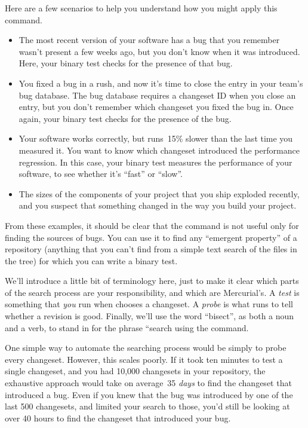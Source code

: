 Here are a few scenarios to help you understand how you might apply
this command.
\begin{itemize}
\item The most recent version of your software has a bug that you
  remember wasn't present a few weeks ago, but you don't know when it
  was introduced.  Here, your binary test checks for the presence of
  that bug.
\item You fixed a bug in a rush, and now it's time to close the entry
  in your team's bug database.  The bug database requires a changeset
  ID when you close an entry, but you don't remember which changeset
  you fixed the bug in.  Once again, your binary test checks for the
  presence of the bug.
\item Your software works correctly, but runs~15\% slower than the
  last time you measured it.  You want to know which changeset
  introduced the performance regression.  In this case, your binary
  test measures the performance of your software, to see whether it's
  ``fast'' or ``slow''.
\item The sizes of the components of your project that you ship
  exploded recently, and you suspect that something changed in the way
  you build your project.
\end{itemize}

From these examples, it should be clear that the 
command is not useful only for finding the sources of bugs.  You can
use it to find any ``emergent property'' of a repository (anything
that you can't find from a simple text search of the files in the
tree) for which you can write a binary test.

We'll introduce a little bit of terminology here, just to make it
clear which parts of the search process are your responsibility, and
which are Mercurial's.  A \emph{test} is something that \emph{you} run
when  chooses a changeset.  A \emph{probe} is what
 runs to tell whether a revision is good.  Finally,
we'll use the word ``bisect'', as both a noun and a verb, to stand in
for the phrase ``search using the  command.

One simple way to automate the searching process would be simply to
probe every changeset.  However, this scales poorly.  If it took ten
minutes to test a single changeset, and you had 10,000 changesets in
your repository, the exhaustive approach would take on average~35
\emph{days} to find the changeset that introduced a bug.  Even if you
knew that the bug was introduced by one of the last 500 changesets,
and limited your search to those, you'd still be looking at over 40
hours to find the changeset that introduced your bug.

